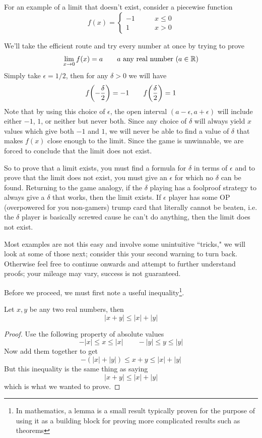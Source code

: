 \begin{example}
	For an example of a limit that doesn't exist, consider a piecewise function
	\[ f(x) = \begin{cases}
	-1 \qquad &x \leq 0 \\
	1 \qquad &x > 0
	\end{cases} \]
	
	We'll take the efficient route and try every number at once by trying to prove
	\[ \lim_{x \to 0} f(x) = a \qquad \text{$a$ any real number ($a \in \mathbb{R}$)} \]
	Simply take $\epsilon = 1/2$, then for any $\delta > 0$ we will have
	\[ f\qty(-\frac{\delta}{2}) = -1 \qquad f\qty(\frac{\delta}{2}) = 1 \]
	Note that by using this choice of $\epsilon$, the open interval $(a - \epsilon, a + \epsilon)$ will include either $-1$, $1$, or neither but never both. Since any choice of $\delta$ will always yield $x$ values which give both $-1$ and $1$, we will never be able to find a value of $\delta$ that makes $f(x)$ close enough to the limit. Since the game is unwinnable, we are forced to conclude that the limit does not exist.
\end{example}

So to prove that a limit exists, you must find a formula for $\delta$ in terms of $\epsilon$ and to prove that the limit does not exist, you must give an $\epsilon$ for which no $\delta$ can be found. Returning to the game analogy, if the $\delta$ playing has a foolproof strategy to always give a $\delta$ that works, then the limit exists. If $\epsilon$ player has some OP (overpowered for you non-gamers) trump card that literally cannot be beaten, i.e. the $\delta$ player is basically screwed cause he can't do anything, then the limit does not exist.

Most examples are not this easy and involve some unintuitive ``tricks," we will look at some of those next; consider this your second warning to turn back. Otherwise feel free to continue onwards and attempt to further understand proofs; your mileage may vary, success is not guaranteed.

Before we proceed, we must first note a useful inequality\footnote{In mathematics, a lemma is a small result typically proven for the purpose of using it as a building block for proving more complicated results such as theorems}. 
\begin{lemma}
	Let $x, y$ be any two real numbers, then
	\[ |x + y| \leq |x| + |y| \]
\end{lemma}
\begin{proof}
	Use the following property of absolute values
	\[ -|x| \leq x \leq |x| \qquad -|y| \leq y \leq |y| \]
	Now add them together to get
	\[ -(|x| + |y|) \leq x + y \leq |x| + |y| \]
	But this inequality is the same thing as saying
	\[ |x + y| \leq |x| + |y| \]
	which is what we wanted to prove.
\end{proof}

